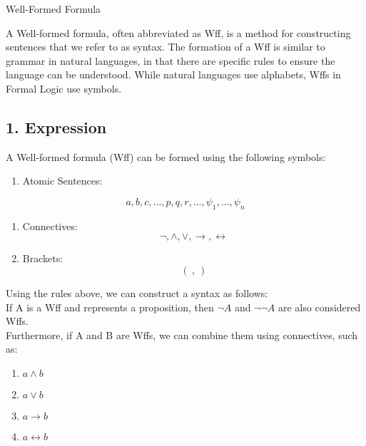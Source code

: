 Well-Formed Formula

A Well-formed formula, often abbreviated as Wff, is a method for
constructing sentences that we refer to as syntax. The formation of a
Wff is similar to grammar in natural languages, in that there are
specific rules to ensure the language can be understood. While natural
languages use alphabets, Wffs in Formal Logic use symbols.

\subsection{1. Expression}\label{expression}

A Well-formed formula (Wff) can be formed using the following symbols:

\begin{enumerate}
\def\labelenumi{\arabic{enumi}.}
\tightlist
\item
  Atomic Sentences:
\end{enumerate}

\[a, b, c, \ldots, p, q, r, \ldots,\psi_1, \ldots, \psi_n\]

\begin{enumerate}
\def\labelenumi{\arabic{enumi}.}
\setcounter{enumi}{1}
\item
  Connectives:\\
  \[\lnot, \land, \lor, \rightarrow, \leftrightarrow\]
\item
  Brackets:\\
  \[( \ , \ )\]
\end{enumerate}

Using the rules above, we can construct a syntax as follows:\\
If A is a Wff and represents a proposition, then \(\lnot A\) and
\(\lnot\lnot A\) are also considered Wffs.\\
Furthermore, if A and B are Wffs, we can combine them using connectives,
such as:

\begin{enumerate}
\def\labelenumi{\arabic{enumi}.}
\tightlist
\item
  \(a \land b\)\\
\item
  \(a \lor b\)\\
\item
  \(a \rightarrow b\)\\
\item
  \(a \leftrightarrow b\)
\end{enumerate}

